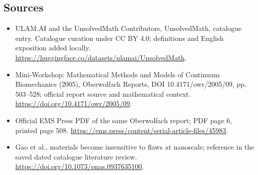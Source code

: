 \documentclass[11pt]{article}
\begin{document}
\subsection{Sources}
\begin{itemize}
\item[\hypertarget{source:statement:1}{S1}] ULAM.AI and the UnsolvedMath Contributors, UnsolvedMath, catalogue entry. Catalogue curation under CC BY 4.0; definitions and English exposition added locally.
\url{https://huggingface.co/datasets/ulamai/UnsolvedMath}.
\item[\hypertarget{source:statement:2}{S2}] Mini-Workshop: Mathematical Methods and Models of Continuum Biomechanics (2005), Oberwolfach Reports, DOI 10.4171/owr/2005/09, pp. 503--528; official report source and mathematical context.
\url{https://doi.org/10.4171/owr/2005/09}.
\item[\hypertarget{source:statement:3}{S3}] Official EMS Press PDF of the same Oberwolfach report; PDF page 6, printed page 508.
\url{https://ems.press/content/serial-article-files/45983}.
\item[\hypertarget{source:statement:4}{S4}] Gao et al., materials become insensitive to flaws at nanoscale; reference in the saved dated catalogue literature review.
\url{https://doi.org/10.1073/pnas.0937635100}.
\end{itemize}
\label{end:statement}
\end{document}
